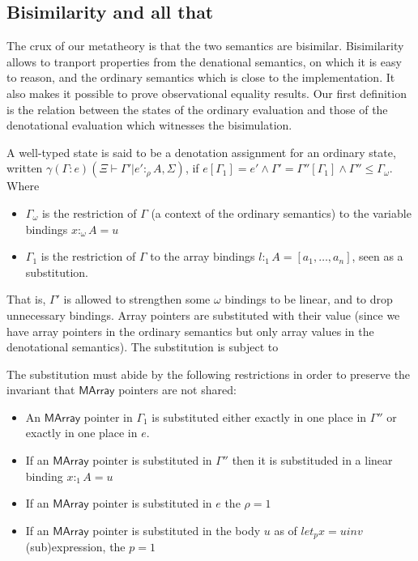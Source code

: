 \documentclass[acmsmall,screen]{acmart}\settopmatter{}
\newcommand{\Conid}[1]{\mathit{#1}}
\renewcommand\Conid[1]{\mathord{\textsf{#1}}}
\newcommand{\ta}[2]{γ(#1)(#2)}
\begin{document}
{\subsection{Bisimilarity and all that}
\label{sec:bisimilarity}

The crux of our metatheory is that the two semantics are
bisimilar. Bisimilarity allows to tranport properties from the
denational semantics, on which it is easy to reason, and the ordinary
semantics which is close to the implementation. It also makes it
possible to prove observational equality results. Our first definition
is the relation between the states of the ordinary evaluation and
those of the denotational evaluation which witnesses the bisimulation.

\begin{definition}
  A well-typed state is said to be a denotation assignment for an ordinary
  state, written $\ta{Γ:e}{Ξ ⊢ Γ' | e' :_ρ A , Σ}$, if
  $e[Γ_1]=e' ∧ Γ' = Γ''[Γ_1] ∧ Γ'' \leqslant Γ_ω$. Where
  \begin{itemize}
  \item $Γ_ω$ is the restriction of $Γ$ (a context of the ordinary
    semantics) to the variable bindings $x :_ω A = u$
  \item $Γ_1$ is the restriction of $Γ$ to the array bindings $l :_1 A
    = [a_1, …, a_n]$, seen as a substitution.
  \end{itemize}
  That is, $Γ'$ is allowed to strengthen some $ω$ bindings to be
  linear, and to drop unnecessary bindings. Array pointers are
  substituted with their value (since we have array pointers in the
  ordinary semantics but only array values in the denotational
  semantics). The substitution is subject to

  The substitution must abide by the following restrictions in order
  to preserve the invariant that \ensuremath{\Conid{MArray}} pointers are not shared:
  \begin{itemize}
  \item An \ensuremath{\Conid{MArray}} pointer in $Γ_1$ is substituted either exactly
    in one place in $Γ''$ or exactly in one place in $e$.
  \item If an \ensuremath{\Conid{MArray}} pointer is substituted in $Γ''$ then it is
    substituded in a linear binding $x :_1 A = u$
  \item If an \ensuremath{\Conid{MArray}} pointer is substituted in $e$ the $ρ=1$
  \item If an \ensuremath{\Conid{MArray}} pointer is substituted in the body $u$ as of
    $let_p x = u in v$ (sub)expression, the $p=1$
  \end{itemize}
\end{definition}

}
\end{document}
